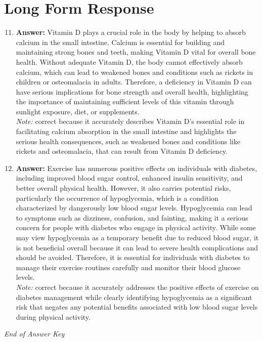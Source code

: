 \documentclass[12pt]{article}
\begin{document}
\section*{Long Form Response}
\begin{enumerate}[label=\arabic*.]
\setcounter{enumi}{10}
\item \textbf{Answer:} Vitamin D plays a crucial role in the body by helping to absorb calcium in the small intestine. Calcium is essential for building and maintaining strong bones and teeth, making Vitamin D vital for overall bone health. Without adequate Vitamin D, the body cannot effectively absorb calcium, which can lead to weakened bones and conditions such as rickets in children or osteomalacia in adults. Therefore, a deficiency in Vitamin D can have serious implications for bone strength and overall health, highlighting the importance of maintaining sufficient levels of this vitamin through sunlight exposure, diet, or supplements.
\\ \textit{Note:} correct because it accurately describes Vitamin D's essential role in facilitating calcium absorption in the small intestine and highlights the serious health consequences, such as weakened bones and conditions like rickets and osteomalacia, that can result from Vitamin D deficiency.
\item \textbf{Answer:} Exercise has numerous positive effects on individuals with diabetes, including improved blood sugar control, enhanced insulin sensitivity, and better overall physical health. However, it also carries potential risks, particularly the occurrence of hypoglycemia, which is a condition characterized by dangerously low blood sugar levels. Hypoglycemia can lead to symptoms such as dizziness, confusion, and fainting, making it a serious concern for people with diabetes who engage in physical activity. While some may view hypoglycemia as a temporary benefit due to reduced blood sugar, it is not beneficial overall because it can lead to severe health complications and should be avoided. Therefore, it is essential for individuals with diabetes to manage their exercise routines carefully and monitor their blood glucose levels.
\\ \textit{Note:} correct because it accurately addresses the positive effects of exercise on diabetes management while clearly identifying hypoglycemia as a significant risk that negates any potential benefits associated with low blood sugar levels during physical activity.
\end{enumerate}

\vfill
\noindent\textit{End of Answer Key}
\end{document}
